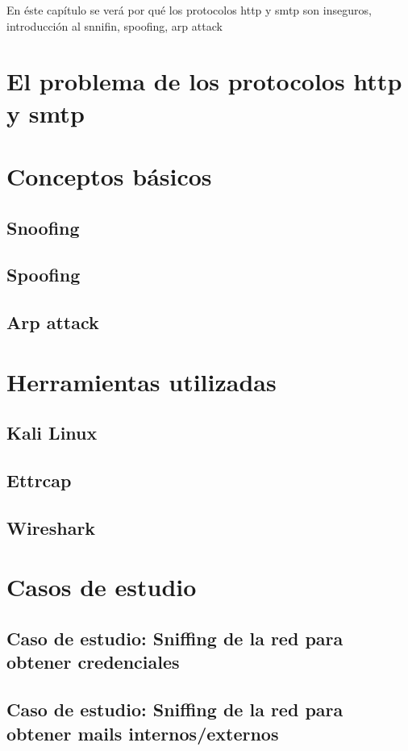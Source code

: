 
En éste capítulo se verá por qué los protocolos http y smtp son inseguros, introducción al snnifin, spoofing, arp attack

\section{El problema de los protocolos http y smtp}
\section{Conceptos básicos}
\subsection{Snoofing}
\subsection{Spoofing}
\subsection{Arp attack}
\section{Herramientas utilizadas}
    \subsection{Kali Linux}
    \subsection{Ettrcap}
    \subsection{Wireshark}
\section{Casos de estudio}
\subsection{Caso de estudio: Sniffing de la red para obtener credenciales}
\subsection{Caso de estudio: Sniffing de la red para obtener mails internos/externos}

